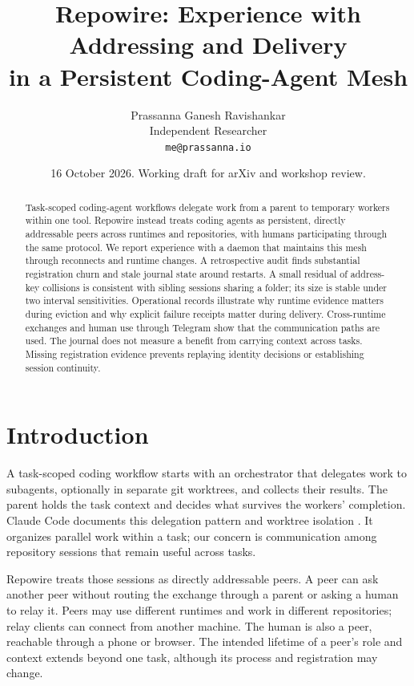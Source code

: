 \documentclass[10pt,twocolumn]{article}
\title{Repowire: Experience with Addressing and Delivery\\in a Persistent Coding-Agent Mesh}
\author{Prassanna Ganesh Ravishankar\\Independent Researcher\\\texttt{me@prassanna.io}\\\todo{co-author line}}
\date{16 October 2026. Working draft for arXiv and workshop review.}
\newcommand{\sys}{Repowire}
\begin{document}
\maketitle
\begin{abstract}
Task-scoped coding-agent workflows delegate work from a parent to temporary workers within one tool. Repowire instead treats coding agents as persistent, directly addressable peers across runtimes and repositories, with humans participating through the same protocol. We report experience with a daemon that maintains this mesh through reconnects and runtime changes. A retrospective audit finds substantial registration churn and stale journal state around restarts. A small residual of address-key collisions is consistent with sibling sessions sharing a folder; its size is stable under two interval sensitivities. Operational records illustrate why runtime evidence matters during eviction and why explicit failure receipts matter during delivery. Cross-runtime exchanges and human use through Telegram show that the communication paths are used. The journal does not measure a benefit from carrying context across tasks. Missing registration evidence prevents replaying identity decisions or establishing session continuity.
\end{abstract}

\section{Introduction}
\label{sec:intro}

A task-scoped coding workflow starts with an orchestrator that delegates work to subagents, optionally in separate git worktrees, and collects their results. The parent holds the task context and decides what survives the workers' completion. Claude Code documents this delegation pattern and worktree isolation \citep{subagents2026}. It organizes parallel work within a task; our concern is communication among repository sessions that remain useful across tasks.

\sys{} treats those sessions as directly addressable peers. A peer can ask another peer without routing the exchange through a parent or asking a human to relay it. Peers may use different runtimes and work in different repositories; relay clients can connect from another machine. The human is also a peer, reachable through a phone or browser. The intended lifetime of a peer's role and context extends beyond one task, although its process and registration may change.
\end{document}
